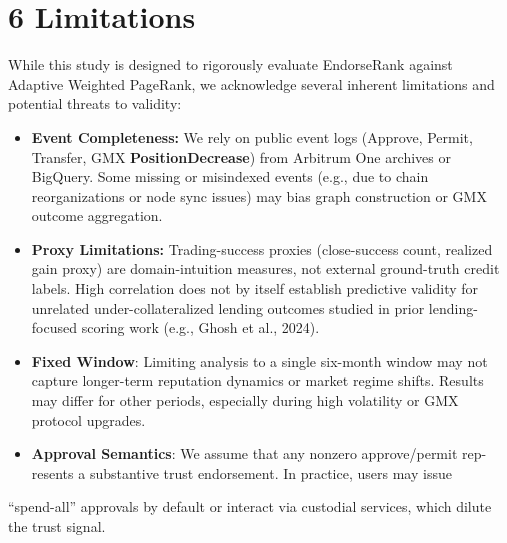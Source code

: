 \clearpage
{}
\section*{6 \textbf{Limitations}}
\label{sec:limitations}

While this study is designed to rigorously evaluate EndorseRank against Adaptive Weighted PageRank, we acknowledge several inherent limitations and potential threats to validity:



\begin{itemize}
\item[\textbullet] \textbf{Event Completeness:} We rely on public event logs (Approve, Permit, Transfer, GMX \textbf{PositionDecrease}) from Arbitrum One archives or BigQuery. Some missing or misindexed events (e.g., due to chain reorganizations or node sync issues) may bias graph construction or GMX outcome aggregation.
\item[\textbullet] \textbf{Proxy Limitations:} Trading-success proxies (close-success count, realized gain proxy) are domain-intuition measures, not external ground-truth credit labels. High correlation does not by itself establish predictive validity for unrelated under-collateralized lending outcomes studied in prior lending-focused scoring work (e.g., Ghosh et al., 2024).
\end{itemize}

\begin{itemize}
\item[\textbullet] \textbf{Fixed Window}: Limiting analysis to a single six-month window may not capture longer-term reputation dynamics or market regime shifts. Results may differ for other periods, especially during high volatility or GMX protocol upgrades.
\end{itemize}

\begin{itemize}
\item[\textbullet] \textbf{Approval Semantics}: We assume that any nonzero approve/permit rep- resents a substantive trust endorsement. In practice, users may issue
\end{itemize}
``spend-all'' approvals by default or interact via custodial services, which dilute the trust signal.


